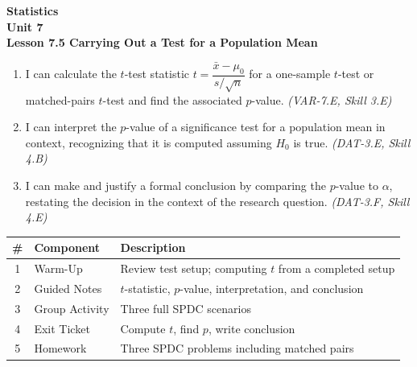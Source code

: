 \documentclass[10pt]{article}
\begin{document}
\vspace{-0.8in}

\begin{center}
  {\color{white}\textbf{\LARGE Statistics}}\\[4pt]
  {\color{skymid}\large\textbf{Unit 7}}\\[6pt]
  {\color{white}\textbf{\large Lesson 7.5 \quad Carrying Out a Test for a Population Mean}}
\end{center}

\vspace{0.22in}
\namedateperiod
\vspace{0.18in}

\begin{learningtargetbox}
\small
\begin{enumerate}[leftmargin=1.5em, itemsep=5pt]
  \item I can calculate the $t$-test statistic $t = \dfrac{\bar x - \mu_0}{s/\sqrt{n}}$
        for a one-sample $t$-test or matched-pairs $t$-test and find the associated $p$-value.
        \textit{(VAR-7.E, Skill 3.E)}
  \item I can interpret the $p$-value of a significance test for a population mean in context,
        recognizing that it is computed assuming $H_0$ is true.
        \textit{(DAT-3.E, Skill 4.B)}
  \item I can make and justify a formal conclusion by comparing the $p$-value to $\alpha$,
        restating the decision in the context of the research question.
        \textit{(DAT-3.F, Skill 4.E)}
\end{enumerate}
\end{learningtargetbox}

\vspace{0.14in}

\begin{tocbox}
\small
\renewcommand{\arraystretch}{1.5}
\begin{tabularx}{\linewidth}{@{} c l X @{}}
\rowcolor{sky}
\textbf{\#} & \textbf{Component} & \textbf{Description} \\
\midrule
1 & Warm-Up        & Review test setup; computing $t$ from a completed setup \\
2 & Guided Notes   & $t$-statistic, $p$-value, interpretation, and conclusion \\
3 & Group Activity & Three full SPDC scenarios \\
4 & Exit Ticket    & Compute $t$, find $p$, write conclusion \\
5 & Homework       & Three SPDC problems including matched pairs \\
\end{tabularx}
\end{tocbox}
\end{document}
